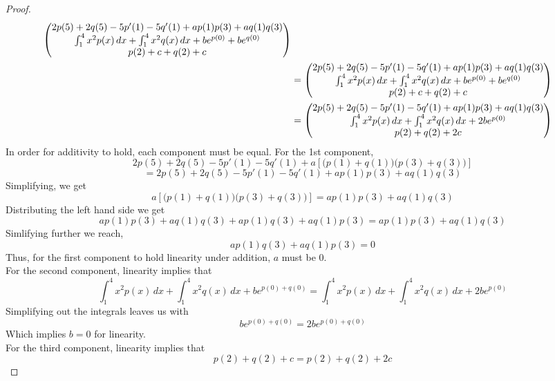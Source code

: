 \documentclass[12pt]{article}
\newcommand{\brac}[1]{\left[ {#1} \right] }
\begin{document}
\begin{enumerate}
\begin{proof}
\begin{align}
\begin{pmatrix}
            2p(5) + 2q(5) -5p'(1) -5q'(1) + ap(1)p(3) + aq(1)q(3) \\
            \int_1^4 x^2 p(x)\,dx + \int_1^4 x^2 q(x)\,dx + be^{p(0)} + be^{q(0)}\\
            p(2) + c + q(2) + c \\ 
        \end{pmatrix}\notag\\
        &= \begin{pmatrix}
            2p(5) + 2q(5) -5p'(1) -5q'(1) + ap(1)p(3) + aq(1)q(3) \\
            \int_1^4 x^2 p(x)\,dx + \int_1^4 x^2 q(x)\,dx + be^{p(0)} + be^{q(0)}\\
            p(2) + c + q(2) + c \\ 
        \end{pmatrix}\notag\\
        &= \begin{pmatrix}
            2p(5) + 2q(5) -5p'(1) -5q'(1) + ap(1)p(3) + aq(1)q(3) \\
            \int_1^4 x^2 p(x)\,dx + \int_1^4 x^2 q(x)\,dx + 2be^{p(0)}\\
            p(2) + q(2) + 2c \\ 
        \end{pmatrix}\notag
    \end{align}
    In order for additivity to hold, each component must be equal. For the 1st component,
    $$2p(5) + 2q(5) -5p'(1) -5q'(1) + a\brac{\big(p(1)+q(1)\big)\big(p(3)+q(3)\big)}$$$$= 2p(5) + 2q(5) -5p'(1) -5q'(1) + ap(1)p(3) + aq(1)q(3)$$
    Simplifying, we get
    $$a\brac{\big(p(1)+q(1)\big)\big(p(3)+q(3)\big)} = ap(1)p(3) + aq(1)q(3)$$
    Distributing the left hand side we get
    $$ap(1)p(3) + aq(1)q(3) + ap(1)q(3) + aq(1)p(3) = ap(1)p(3) + aq(1)q(3)$$
    Simlifying further we reach,
    $$ap(1)q(3) + aq(1)p(3) = 0$$
    Thus, for the first component to hold linearity under addition, $a$ must be 0.
    \vspace{0.3in}\\
    For the second component, linearity implies that
    $$\int_1^4 x^2 p(x)\,dx + \int_1^4 x^2q(x)\,dx + be^{p(0)+q(0)} = \int_1^4 x^2 p(x)\,dx + \int_1^4 x^2 q(x)\,dx + 2be^{p(0)}$$
    Simplifying out the integrals leaves us with
    $$be^{p(0)+q(0)} = 2be^{p(0)+q(0)}$$
    Which implies $b = 0$ for linearity.
    \vspace{0.3in}\\
    For the third component, linearity implies that
    $$p(2) + q(2) + c = p(2) + q(2) + 2c$$

\end{proof}
\end{enumerate}
\end{document}
